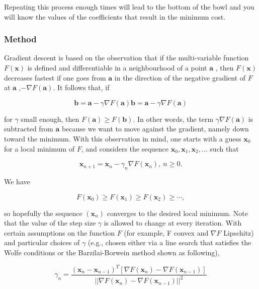 \documentclass[11pt, a4paper]{report}
\begin{document}
Repeating this process enough times will lead to the bottom of the bowl and you will know the values of the coefficients that result in the minimum cost. \cite{desc:GradientDescent}

\subsubsection{Method}


Gradient descent is based on the observation that if the multi-variable function
\(F(\mathbf {x} ) \) is defined and differentiable in a neighbourhood of a point \({\displaystyle \mathbf {a} } \) , 
then \( {\displaystyle F(\mathbf {x} )} \) decreases fastest if one goes from \({\displaystyle \mathbf {a} } \) in the direction of the negative gradient of \({\displaystyle F} \) at \( {\displaystyle \mathbf {a} }\) ,\( {\displaystyle -\nabla F(\mathbf {a} )} \). It follows that, if

\[ {\displaystyle \mathbf {b} =\mathbf {a} -\gamma \nabla F(\mathbf {a} )} \mathbf {b} =\mathbf {a} -\gamma \nabla F(\mathbf {a} ) \]

for \({\displaystyle \gamma }\)   small enough, then $ \displaystyle F(\mathbf {a}) \geq F(\mathbf {b}) $. In other words, the term \({\displaystyle \gamma \nabla F(\mathbf {a} )} \) is subtracted from $ \mathbf {a} $  because we want to move against the gradient, namely 
down toward the minimum. With this observation in mind, one starts with a guess $ \mathbf {x} _{0} $ for a local minimum of  $ F $, and considers the sequence $ \mathbf {x} _{0},\mathbf {x} _{1},\mathbf {x} _{2},\dots $ such that

\[ \mathbf {x} _{n+1}=\mathbf {x} _{n}-\gamma _{n}\nabla F(\mathbf {x} _{n}),\ n\geq 0. \]

We have

\[ F(\mathbf {x} _{0})\geq F(\mathbf {x} _{1})\geq F(\mathbf {x} _{2})\geq \cdots , \]

so hopefully the sequence  $ (\mathbf {x} _{n}) $ converges to the desired local minimum. Note that the value of the step size $ \gamma  $ is allowed to change at every iteration. With certain assumptions on the function $ F $ (for example,  F convex and $ \nabla F $ Lipschitz) and particular choices of  $ \gamma  $ (e.g., chosen either via a line search that satisfies the Wolfe conditions or the Barzilai-Borwein method shown as following),

\[ {\displaystyle \gamma _{n}={\frac {(\mathbf {x} _{n}-\mathbf {x} _{n-1})^{T}[\nabla F(\mathbf {x} _{n})-\nabla F(\mathbf {x} _{n-1})]}{||\nabla F(\mathbf {x} _{n})-\nabla F(\mathbf {x} _{n-1})||^{2}}}} \]
\end{document}
